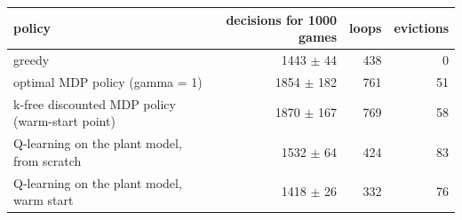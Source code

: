 \begin{tabular}{lrrr}
\toprule
policy & decisions for 1000 games & loops & evictions \\
\midrule
greedy & 1443 $\pm$ 44 & 438 & 0 \\
optimal MDP policy (gamma = 1) & 1854 $\pm$ 182 & 761 & 51 \\
k-free discounted MDP policy (warm-start point) & 1870 $\pm$ 167 & 769 & 58 \\
Q-learning on the plant model, from scratch & 1532 $\pm$ 64 & 424 & 83 \\
Q-learning on the plant model, warm start & 1418 $\pm$ 26 & 332 & 76 \\
\bottomrule
\end{tabular}
